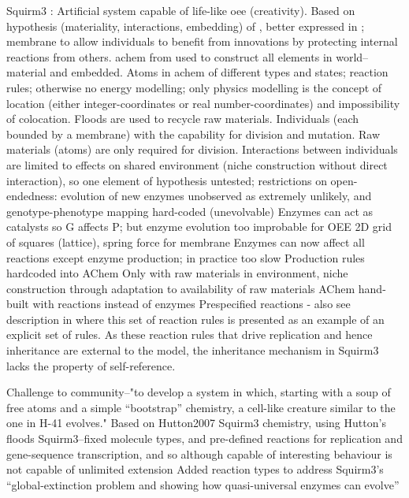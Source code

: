 \begin{NOTES}
Squirm3 \cite{Hutton2007,Hutton2002}:
Artificial system capable of life-like \gls{oee} (creativity).
Based on hypothesis (materiality, interactions, embedding) of \textcite{Taylor2001}, better expressed in \textcite[p.341]{Hutton2002}; membrane to allow individuals to benefit from innovations by protecting internal reactions from others.
\Gls{achem} from \textcite{Hutton2002} used to construct all elements in world--material and embedded.
Atoms in \gls{achem} of different types and states; reaction rules; otherwise no energy modelling; only physics modelling is the concept of location (either integer-coordinates or real number-coordinates) and impossibility of colocation. Floods are used to recycle raw materials.
Individuals (each bounded by a membrane) with the capability for division and mutation. Raw materials (atoms) are only required for division.
Interactions between individuals are limited to effects on shared environment (niche construction without direct interaction), so one element of hypothesis untested; restrictions on open-endedness: evolution of new enzymes unobserved as extremely unlikely, and genotype-phenotype mapping hard-coded (unevolvable)
Enzymes can act as catalysts so G affects P; but enzyme evolution too improbable for OEE
2D grid of squares (lattice), spring force for membrane
Enzymes can now affect all reactions except enzyme production; in practice too slow
Production rules hardcoded into AChem
Only with raw materials in environment, niche construction through adaptation to availability of raw materials
AChem hand-built with reactions instead of enzymes
Prespecified reactions \parencite[p.4]{Hutton2007}- also see description in \cite[p.49]{Faulconbridge2011} where this set of reaction rules is presented as an example of an explicit set of rules. As these reaction rules that drive replication and hence inheritance are external to the model, the inheritance mechanism in Squirm3 lacks the property of self-reference.

\parencite{Lucht2012}

Challenge to community--"to develop a system in which, starting with a soup of free atoms and a simple ``bootstrap'' chemistry, a cell-like creature similar to the one in H-41 evolves."
Based on Hutton2007 Squirm3 chemistry, using Hutton's floods 
Squirm3--fixed molecule types, and pre-defined reactions for replication and gene-sequence transcription, and so although capable of interesting behaviour is not capable of unlimited extension
Added reaction types to address Squirm3's ``global-extinction problem and showing how quasi-universal enzymes can evolve''

\end{NOTES}

